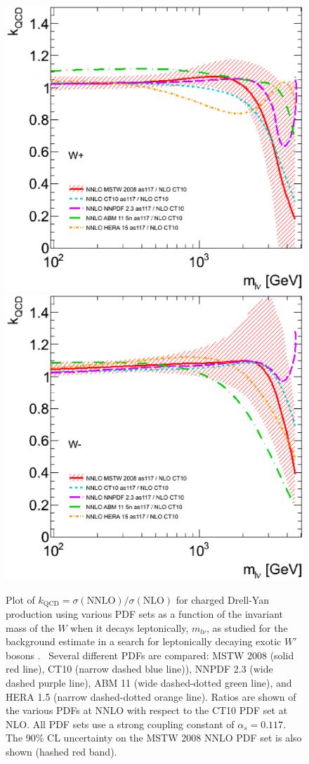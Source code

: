 \begin{figure}[ht]
\centering
\includegraphics[width=.48\textwidth]{figures/theory/QCDKFac_Separate_WPLUS.eps}
\includegraphics[width=.48\textwidth]{figures/theory/QCDKFac_Separate_WMINUS.eps}
\caption{Plot of 
$k_{\textrm{QCD}}=\sigma(\textrm{NNLO})/\sigma(\textrm{NLO})$
for charged Drell-Yan production using various PDF sets 
as a function of the invariant
mass of the $W$ when it decays leptonically, $m_{l\nu}$, as studied
for the background estimate in a search for leptonically
decaying exotic $W'$ bosons \cite{Aad:1746306,Adams:1748664}.~
Several different PDFs are compared: 
MSTW 2008 \cite{Martin:2009iq} (solid red line), 
CT10 \cite{guzzi:2011sv} (narrow dashed blue line)), 
NNPDF 2.3 \cite{Ball:2012cx} (wide dashed purple line),  
ABM 11 \cite{Alekhin:2012ig} (wide dashed-dotted green line),
and  HERA 1.5 \cite{Radescu:2011cn} (narrow dashed-dotted orange line).
Ratios are shown of the various PDFs at NNLO with respect to the CT10
PDF set at NLO. All PDF sets use a strong coupling constant
of $\alpha_s = 0.117$. The 90\% CL uncertainty on the MSTW 2008 NNLO 
PDF set is also shown (hashed red band).  }
\label{fig:wprime_kfac}
\end{figure}


